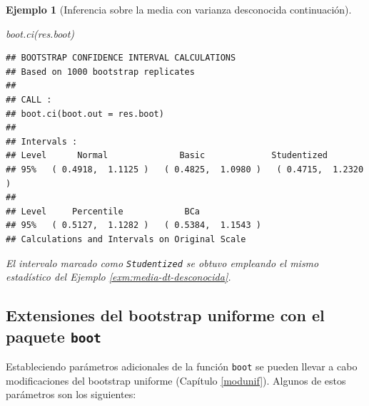 \documentclass[
]{book}
\newenvironment{Shaded}{\begin{snugshade}}{\end{snugshade}}
\newcommand{\FunctionTok}[1]{\textcolor[rgb]{0.00,0.00,0.00}{#1}}
\newcommand{\NormalTok}[1]{#1}
\theoremstyle{break}
\newtheorem{example}{Ejemplo}[chapter]
\theoremstyle{nonumberplain}
\begin{document}
\begin{example}[Inferencia sobre la media con varianza desconocida continuación]
\begin{Shaded}
\begin{Highlighting}[]
\FunctionTok{boot.ci}\NormalTok{(res.boot)}
\end{Highlighting}
\end{Shaded}

\begin{verbatim}
## BOOTSTRAP CONFIDENCE INTERVAL CALCULATIONS
## Based on 1000 bootstrap replicates
## 
## CALL : 
## boot.ci(boot.out = res.boot)
## 
## Intervals : 
## Level      Normal              Basic             Studentized     
## 95%   ( 0.4918,  1.1125 )   ( 0.4825,  1.0980 )   ( 0.4715,  1.2320 )  
## 
## Level     Percentile            BCa          
## 95%   ( 0.5127,  1.1282 )   ( 0.5384,  1.1543 )  
## Calculations and Intervals on Original Scale
\end{verbatim}

El intervalo marcado como \texttt{Studentized} se obtuvo empleando el mismo estadístico del Ejemplo \ref{exm:media-dt-desconocida}.
\end{example}

\hypertarget{extensiones-del-bootstrap-uniforme-con-el-paquete-boot}{%
\subsection{\texorpdfstring{Extensiones del bootstrap uniforme con el paquete \texttt{boot}}{Extensiones del bootstrap uniforme con el paquete boot}}\label{extensiones-del-bootstrap-uniforme-con-el-paquete-boot}}

Estableciendo parámetros adicionales de la función \texttt{boot} se pueden llevar
a cabo modificaciones del bootstrap uniforme (Capítulo \ref{modunif}).
Algunos de estos parámetros son los siguientes:
\end{document}
